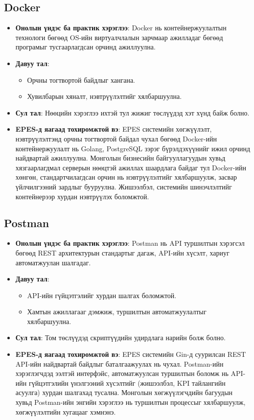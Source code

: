\subsection{Docker}
\begin{itemize}
    \item \textbf{Онолын үндэс ба практик хэрэглээ}: Docker нь контейнержуулалтын технологи бөгөөд OS-ийн виртуалчлалын зарчмаар ажилладаг бөгөөд програмыг 
    тусгаарлагдсан орчинд ажиллуулна.
    \item \textbf{Давуу тал}:
    \begin{itemize}
        \item Орчны тогтвортой байдлыг хангана.
        \item Хувилбарын хяналт, нэвтрүүлэлтийг хялбаршуулна.
    \end{itemize}
    \item \textbf{Сул тал}: Нөөцийн хэрэглээ ихтэй тул жижиг төслүүдэд хэт хүнд байж болно.
    \item \textbf{EPES-д яагаад тохиромжтой вэ}: EPES системийн хөгжүүлэлт, нэвтрүүлэлтэнд орчны тогтвортой байдал чухал бөгөөд Docker-ийн контейнержуулалт нь 
    Golang, PostgreSQL зэрэг бүрэлдэхүүнийг ижил орчинд найдвартай ажиллуулна. Монголын бизнесийн байгууллагуудын хувьд хязгаарлагдмал серверын нөөцтэй ажиллах 
    шаардлага байдаг тул Docker-ийн хөнгөн, стандартчилагдсан орчин нь нэвтрүүлэлтийг хялбаршуулж, засвар үйлчилгээний зардлыг бууруулна. Жишээлбэл, системийн 
    шинэчлэлтийг контейнерээр хурдан нэвтрүүлэх боломжтой.
\end{itemize}

\subsection{Postman}
\begin{itemize}
    \item \textbf{Онолын үндэс ба практик хэрэглээ}: Postman нь API туршилтын хэрэгсэл бөгөөд REST архитектурын стандартыг дагаж, API-ийн хүсэлт, хариуг 
    автоматжуулан шалгадаг.
    \item \textbf{Давуу тал}:
    \begin{itemize}
        \item API-ийн гүйцэтгэлийг хурдан шалгах боломжтой.
        \item Хамтын ажиллагааг дэмжиж, туршилтын автоматжуулалтыг хялбаршуулна.
    \end{itemize}
    \item \textbf{Сул тал}: Том төслүүдэд скриптүүдийн удирдлага нарийн болж болно.
    \item \textbf{EPES-д яагаад тохиромжтой вэ}: EPES системийн Gin-д суурилсан REST API-ийн найдвартай байдлыг баталгаажуулах нь чухал. Postman-ийн хэрэглэгчдэд 
    ээлтэй интерфэйс, автоматжуулсан туршилтын боломж нь API-ийн гүйцэтгэлийн үнэлгээний хүсэлтийг (жишээлбэл, KPI тайлангийн асуулга) хурдан шалгахад тусална. 
    Монголын хөгжүүлэгчдийн багуудын хувьд Postman-ийн энгийн хэрэглээ нь туршилтын процессыг хялбаршуулж, хөгжүүлэлтийн хугацааг хэмнэнэ.
\end{itemize}


